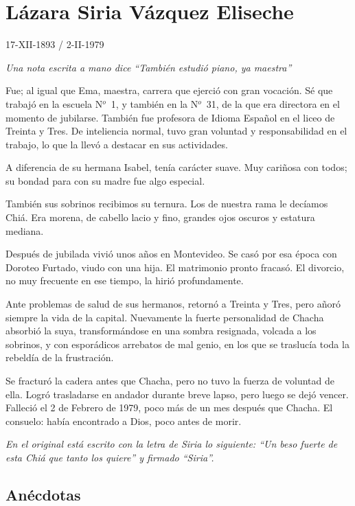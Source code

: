 \documentclass[a4paper]{article}
\begin{document}
\section{Lázara Siria Vázquez Eliseche}

17-XII-1893 / 2-II-1979

\bigbreak{}

\emph{Una nota escrita a mano dice ``También estudió piano, ya maestra''}

\bigbreak{}

Fue; al igual que Ema, maestra, carrera que ejerció con gran vocación. Sé que trabajó en la escuela N$^o$~1, y también en la N$^o$~31, de la que era directora en el momento de jubilarse. También fue profesora de Idioma Español en el liceo de Treinta y Tres. De inteliencia normal, tuvo gran voluntad y responsabilidad en el trabajo, lo que la llevó a destacar en sus actividades.

A diferencia de su hermana Isabel, tenía carácter suave. Muy cariñosa con todos; su bondad para con su madre fue algo especial.

También sus sobrinos recibimos su ternura. Los de nuestra rama le decíamos Chiá. Era morena, de cabello lacio y fino, grandes ojos oscuros y estatura mediana.

Después de jubilada vivió unos años en Montevideo. Se casó por esa época con Doroteo Furtado, viudo con una hija. El matrimonio pronto fracasó. El divorcio, no muy frecuente en ese tiempo, la hirió profundamente.

Ante problemas de salud de sus hermanos, retornó a Treinta y Tres, pero añoró siempre la vida de la capital. Nuevamente la fuerte personalidad de Chacha absorbió la suya, transformándose en una sombra resignada, volcada a los sobrinos, y con esporádicos arrebatos de mal genio, en los que se traslucía toda la rebeldía de la frustración.

Se fracturó la cadera antes que Chacha, pero no tuvo la fuerza de voluntad de ella. Logró trasladarse en andador durante breve lapso, pero luego se dejó vencer. Falleció el 2 de Febrero de 1979, poco más de un mes después que Chacha. El consuelo: había encontrado a Dios, poco antes de morir.

\emph{En el original está escrito con la letra de Siria lo siguiente: ``Un beso fuerte de esta Chiá que tanto los quiere'' y firmado ``Siria''.}

\subsection{Anécdotas}
\end{document}
